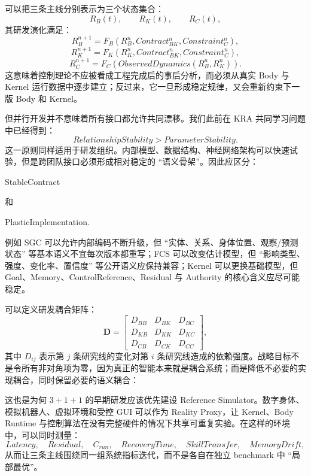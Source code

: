 可以把三条主线分别表示为三个状态集合：
\[
R_B(t),\qquad
R_K(t),\qquad
R_C(t),
\]
其研发演化满足：
\[
R_B^{n+1}
=
F_B
\left(
R_B^n,
Contract_{BK}^n,
Constraint_C^n
\right),
\]
\[
R_K^{n+1}
=
F_K
\left(
R_K^n,
Contract_{BK}^n,
Constraint_C^n
\right),
\]
\[
R_C^{n+1}
=
F_C
\left(
ObservedDynamics(R_B^n,R_K^n)
\right).
\]
这意味着控制理论不应被看成工程完成后的事后分析，而必须从真实 Body 与 Kernel 运行数据中逐步建立；反过来，它一旦形成稳定规律，又会重新约束下一版 Body 和 Kernel。

但并行开发并不意味着所有接口都允许共同漂移。我们此前在 KRA 共同学习问题中已经得到：
\[
\boxed{
RelationshipStability > ParameterStability.
}
\]
这一原则同样适用于研发组织。内部模型、数据结构、神经网络架构可以快速试验，但是跨团队接口必须形成相对稳定的 ``语义骨架''。因此应区分：
\begin{statementbox}
StableContract
\end{statementbox}
和
\begin{statementbox}
PlasticImplementation.
\end{statementbox}
例如 SGC 可以允许内部编码不断升级，但 ``实体、关系、身体位置、观察/预测状态'' 等基本语义不宜每次版本都重写；FCS 可以改变估计模型，但 ``影响类型、强度、变化率、置信度'' 等公开语义应保持兼容；Kernel 可以更换基础模型，但 Goal、Memory、ControlReference、Residual 与 Authority 的核心含义应尽可能稳定。

可以定义研发耦合矩阵：
\[
\mathbf D
=
\begin{bmatrix}
D_{BB} & D_{BK} & D_{BC}\\
D_{KB} & D_{KK} & D_{KC}\\
D_{CB} & D_{CK} & D_{CC}
\end{bmatrix},
\]
其中 $D_{ij}$ 表示第 $j$ 条研究线的变化对第 $i$ 条研究线造成的依赖强度。战略目标不是令所有非对角项为零，因为真正的智能本来就是耦合系统；而是降低不必要的实现耦合，同时保留必要的语义耦合：
\begin{statementbox}
\centering
{}
\end{statementbox}

这也是为何 $3+1+1$ 的早期研发应该优先建设 Reference Simulator。数字身体、模拟机器人、虚拟环境和受控 GUI 可以作为 Reality Proxy，让 Kernel、Body Runtime 与控制算法在没有完整硬件的情况下共享可重复实验。在这样的环境中，可以同时测量：
\[
Latency,\quad
Residual,\quad
C_{run},\quad
RecoveryTime,\quad
SkillTransfer,\quad
MemoryDrift,
\]
从而让三条主线围绕同一组系统指标迭代，而不是各自在独立 benchmark 中 ``局部最优''。

